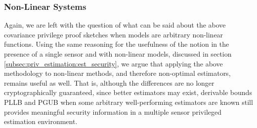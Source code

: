 \subsubsection{Non-Linear Systems}
Again, we are left with the question of what can be said about the above covariance privilege proof sketches when models are arbitrary non-linear functions. Using the same reasoning for the usefulness of the notion in the presence of a single sensor and with non-linear models, discussed in section \ref{subsec:priv_estimation:est_security}, we argue that applying the above methodology to non-linear methods, and therefore non-optimal estimators, remains useful as well. That is, although the differences are no longer cryptographically guaranteed, since better estimators may exist, derivable bounds PLLB and PGUB when some arbitrary well-performing estimators are known still provides meaningful security information in a multiple sensor privileged estimation environment.

% 
% 

